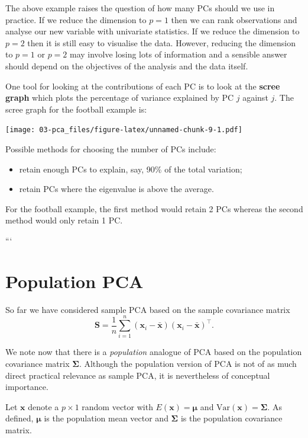 \documentclass[]{book}
\providecommand{\tightlist}{%
  \setlength{\itemsep}{0pt}\setlength{\parskip}{0pt}}
\theoremstyle{definition}
\theoremstyle{definition}
\theoremstyle{definition}
\theoremstyle{remark}
\begin{document}
The above example raises the question of how many PCs should we use in practice. If we reduce the dimension to \(p=1\) then we can rank observations and analyse our new variable with univariate statistics. If we reduce the dimension to \(p=2\) then it is still easy to visualise the data. However, reducing the dimension to \(p=1\) or \(p=2\) may involve losing lots of information and a sensible answer should depend on the objectives of the analysis and the data itself.

One tool for looking at the contributions of each PC is to look at the \textbf{scree graph} which plots the percentage of variance explained by PC \(j\) against \(j\). The scree graph for the football example is:

\texttt{[image: 03-pca\_files/figure-latex/unnamed-chunk-9-1.pdf]}

Possible methods for choosing the number of PCs include:

\begin{itemize}
\tightlist
\item
  retain enough PCs to explain, say, 90\% of the total variation;
\item
  retain PCs where the eigenvalue is above the average.
\end{itemize}

For the football example, the first method would retain 2 PCs whereas the second method would only retain 1 PC.

```

\hypertarget{population-pca}{%
\section{Population PCA}\label{population-pca}}

So far we have considered sample PCA based on the sample covariance matrix
\[
\boldsymbol S=\frac{1}{n}\sum_{i=1}^n (\boldsymbol x_i-\bar{\boldsymbol x})(\boldsymbol x_i-\bar{\boldsymbol x})^\top.
\]

We note now that there is a \emph{population} analogue of PCA based on the population
covariance matrix \(\boldsymbol \Sigma\). Although the population version of PCA is not of as much direct practical
relevance as sample PCA, it is nevertheless of conceptual importance.

Let \(\boldsymbol x\) denote a \(p \times 1\) random vector with \(E(\boldsymbol x)={\pmb \mu}\) and \(\text{Var}(\boldsymbol x)={\pmb \Sigma}\). As defined,
\(\pmb \mu\) is the population mean vector and \(\pmb \Sigma\) is the population covariance matrix.
\end{document}
